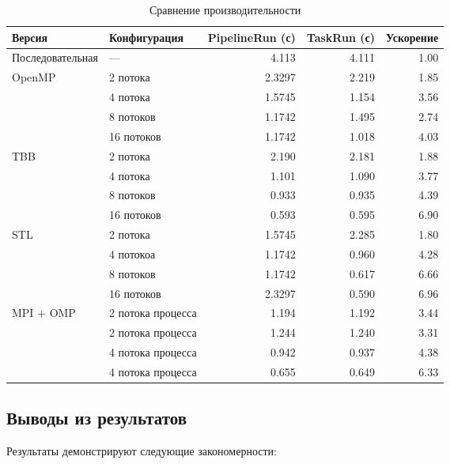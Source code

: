 \documentclass[a4paper,12pt]{article}
\begin{document}
\begin{table}[H]
\centering
\footnotesize
\renewcommand{\arraystretch}{1.2}
\setlength{\tabcolsep}{4pt}
\begin{tabularx}{0.95\textwidth}{@{}l>{\raggedright}Xrrr@{}}
\toprule
\textbf{Версия} & \textbf{Конфигурация} & \textbf{PipelineRun (с)} & \textbf{TaskRun (с)} & \textbf{Ускорение} \\ 
\midrule
Последовательная & — & 4.113 & 4.111 & 1.00 \\
\midrule

OpenMP 
  & 2 потока & 2.3297 & 2.219 & 1.85 \\
  & 4 потока & 1.5745 & 1.154 & 3.56 \\
  & 8 потоков & 1.1742 & 1.495 & 2.74 \\
  & 16 потоков & 1.1742 & 1.018 & 4.03 \\
\midrule

TBB 
  & 2 потока & 2.190 & 2.181 & 1.88 \\
  & 4 потока & 1.101 & 1.090 & 3.77 \\
  & 8 потоков & 0.933 & 0.935 & 4.39 \\
  & 16 потоков & 0.593 & 0.595 & 6.90 \\
\midrule

STL
  & 2 потока & 1.5745 & 2.285 & 1.80 \\
  & 4 потокоа & 1.1742 & 0.960 & 4.28 \\
  & 8 потоков & 1.1742 & 0.617 & 6.66 \\
  & 16 потоков & 2.3297 & 0.590 & 6.96 \\
\midrule

MPI + OMP 
  & 2 потока \times 2 процесса & 1.194 & 1.192 & 3.44 \\
  & 2 потока \times 4 процесса & 1.244 & 1.240 & 3.31 \\
  & 4 потока \times 2 процесса & 0.942 & 0.937 & 4.38 \\
  & 4 потока \times 4 процесса & 0.655 & 0.649 & 6.33 \\
\bottomrule
\end{tabularx}
\caption{Сравнение производительности}
\label{table:benchmark}
\end{table}

\subsection{Выводы из результатов}

Результаты демонстрируют следующие закономерности: \\
\end{document}
